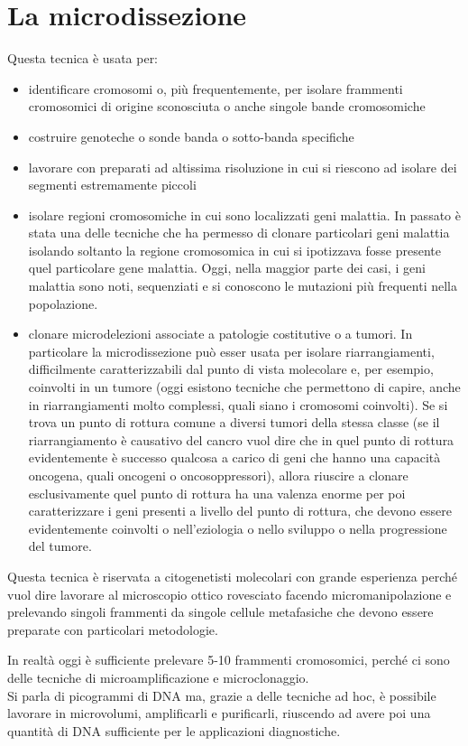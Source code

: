\documentclass[11pt]{book}
\begin{document}
\section{La microdissezione}
Questa tecnica è usata per:
\begin{itemize}
\item identificare cromosomi o, più frequentemente, per isolare frammenti cromosomici di origine sconosciuta o anche singole bande cromosomiche
\item costruire genoteche o sonde banda o sotto-banda specifiche
\item lavorare con preparati ad altissima risoluzione in cui si riescono ad isolare dei segmenti estremamente piccoli
\item isolare regioni cromosomiche in cui sono localizzati geni malattia. In passato è stata una delle tecniche che ha permesso di clonare particolari geni malattia isolando soltanto la regione cromosomica in cui si ipotizzava fosse presente quel particolare gene malattia. Oggi, nella maggior parte dei casi, i geni malattia sono noti, sequenziati e si conoscono le mutazioni più frequenti nella popolazione.
\item  clonare microdelezioni associate a patologie costitutive o a tumori. In particolare la microdissezione può esser usata per isolare riarrangiamenti, difficilmente caratterizzabili dal punto di vista molecolare e, per esempio, coinvolti in un tumore (oggi esistono tecniche che permettono di capire, anche in riarrangiamenti molto complessi, quali siano i cromosomi coinvolti). Se si trova un punto di rottura comune a diversi tumori della stessa classe (se il riarrangiamento è causativo del cancro vuol dire che in quel punto di rottura evidentemente è successo qualcosa a carico di geni che hanno una capacità oncogena, quali oncogeni o oncosoppressori), allora riuscire a clonare esclusivamente quel punto di rottura ha una valenza enorme per poi caratterizzare i geni presenti a livello del punto di rottura, che devono essere evidentemente coinvolti o nell’eziologia o nello sviluppo o nella progressione del tumore.
\end{itemize}
 
Questa tecnica è riservata a citogenetisti molecolari con grande esperienza perché vuol dire lavorare al microscopio ottico rovesciato facendo micromanipolazione e prelevando singoli frammenti da singole cellule metafasiche che devono essere preparate con particolari metodologie.

In realtà oggi è sufficiente prelevare 5-10 frammenti cromosomici, perché ci sono delle tecniche di microamplificazione e microclonaggio.\\
Si parla di picogrammi di DNA ma, grazie a delle tecniche ad hoc, è possibile lavorare in microvolumi, amplificarli e purificarli, riuscendo ad avere poi una quantità di DNA sufficiente per le applicazioni diagnostiche.
\end{document}
